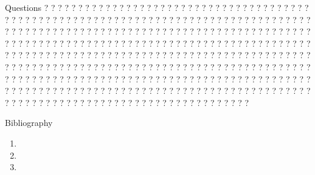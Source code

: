 \documentclass[pdf, autumn, slideColor, nocolorBG]{prosper}
\begin{document}








\begin{slide}{Questions}
? ? ? ? ? ? ? ? ? ? ? ? ? ? ? ? ? ? ? ? ? ? ? ? ? ? ? ? ? ? ? 
? ? ? ? ? ? ? ? ? ? ? ? ? ? ? ? ? ? ? ? ? ? ? ? ? ? ? ? ? ? ? 
? ? ? ? ? ? ? ? ? ? ? ? ? ? ? ? ? ? ? ? ? ? ? ? ? ? ? ? ? ? ? 
? ? ? ? ? ? ? ? ? ? ? ? ? ? ? ? ? ? ? ? ? ? ? ? ? ? ? ? ? ? ? 
? ? ? ? ? ? ? ? ? ? ? ? ? ? ? ? ? ? ? ? ? ? ? ? ? ? ? ? ? ? ? 
? ? ? ? ? ? ? ? ? ? ? ? ? ? ? ? ? ? ? ? ? ? ? ? ? ? ? ? ? ? ? 
? ? ? ? ? ? ? ? ? ? ? ? ? ? ? ? ? ? ? ? ? ? ? ? ? ? ? ? ? ? ? 
? ? ? ? ? ? ? ? ? ? ? ? ? ? ? ? ? ? ? ? ? ? ? ? ? ? ? ? ? ? ? 
? ? ? ? ? ? ? ? ? ? ? ? ? ? ? ? ? ? ? ? ? ? ? ? ? ? ? ? ? ? ? 
? ? ? ? ? ? ? ? ? ? ? ? ? ? ? ? ? ? ? ? ? ? ? ? ? ? ? ? ? ? ? 
? ? ? ? ? ? ? ? ? ? ? ? ? ? ? ? ? ? ? ? ? ? ? ? ? ? ? ? ? ? ? 
? ? ? ? ? ? ? ? ? ? ? ? ? ? ? ? ? ? ? ? ? ? ? ? ? ? ? ? ? ? ? 
? ? ? ? ? ? ? ? ? ? ? ? ? ? ? ? ? ?
\end{slide}

\begin{slide}{Bibliography}
\tiny
\begin{enumerate}
    \item {}
    \item {}
    \item {}
\end{enumerate}
\end{slide}
\end{document}
